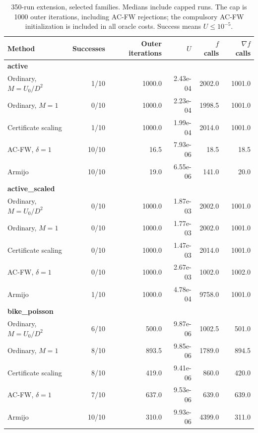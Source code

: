 \begin{table}[htbp]
\centering\small
\caption{350-run extension, selected families. Medians include capped runs. The cap is 1000 outer iterations, including AC-FW rejections; the compulsory AC-FW initialization is included in all oracle costs. Success means $U\le10^{-5}$.}
\label{tab:backtracking}
\begin{tabular}{lrrrrr}
\hline
Method & Successes & Outer iterations & $U$ & $f$ calls & $\nabla f$ calls \\
\hline
\multicolumn{6}{l}{\textbf{active}} \\
Ordinary, $M=U_0/D^2$ & 1/10 & 1000.0 & 2.43e-04 & 2002.0 & 1001.0 \\
Ordinary, $M=1$ & 0/10 & 1000.0 & 2.23e-04 & 1998.5 & 1001.0 \\
Certificate scaling & 1/10 & 1000.0 & 1.99e-04 & 2014.0 & 1001.0 \\
AC-FW, $\delta=1$ & 10/10 & 16.5 & 7.93e-06 & 18.5 & 18.5 \\
Armijo & 10/10 & 19.0 & 6.55e-06 & 141.0 & 20.0 \\
\hline
\multicolumn{6}{l}{\textbf{active\_scaled}} \\
Ordinary, $M=U_0/D^2$ & 0/10 & 1000.0 & 1.87e-03 & 2002.0 & 1001.0 \\
Ordinary, $M=1$ & 0/10 & 1000.0 & 1.77e-03 & 2002.0 & 1001.0 \\
Certificate scaling & 0/10 & 1000.0 & 1.47e-03 & 2014.0 & 1001.0 \\
AC-FW, $\delta=1$ & 0/10 & 1000.0 & 2.67e-03 & 1002.0 & 1002.0 \\
Armijo & 1/10 & 1000.0 & 4.78e-04 & 9758.0 & 1001.0 \\
\hline
\multicolumn{6}{l}{\textbf{bike\_poisson}} \\
Ordinary, $M=U_0/D^2$ & 6/10 & 500.0 & 9.87e-06 & 1002.5 & 501.0 \\
Ordinary, $M=1$ & 8/10 & 893.5 & 9.85e-06 & 1789.0 & 894.5 \\
Certificate scaling & 8/10 & 419.0 & 9.41e-06 & 860.0 & 420.0 \\
AC-FW, $\delta=1$ & 7/10 & 637.0 & 9.53e-06 & 639.0 & 639.0 \\
Armijo & 10/10 & 310.0 & 9.93e-06 & 4399.0 & 311.0 \\
\hline
\end{tabular}
\end{table}
